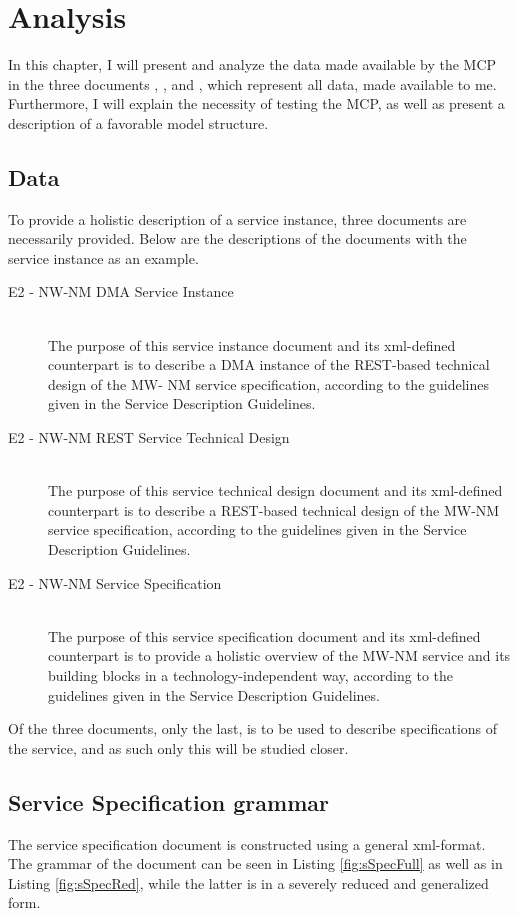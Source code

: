 \chapter{Analysis}

In this chapter, I will present and analyze the data made available by the MCP in the three documents , , and , which represent all data, made available to me. Furthermore, I will explain the necessity of testing the MCP, as well as present a description of a favorable model structure. 

\section{Data}

To provide a holistic description of a service instance, three documents are necessarily provided. Below are the descriptions of the documents with the service instance  as an example.
\begin{description}
	\item[E2 - NW-NM DMA Service Instance]\ \\
	The purpose of this service instance document and its xml-defined counterpart is to describe a DMA instance of the REST-based technical design of the MW- NM service specification, according to the guidelines given in the Service Description Guidelines.
	\item[E2 - NW-NM REST Service Technical Design]\ \\
	The purpose of this service technical design document and its xml-defined counterpart is to describe a REST-based technical design of the MW-NM service specification, according to the guidelines given in the Service Description Guidelines.
	\item[E2 - NW-NM Service Specification]\ \\
	The purpose of this service specification document and its xml-defined counterpart is to provide a holistic overview of the MW-NM service and its building blocks in a technology-independent way, according to the guidelines given in the Service Description Guidelines.
\end{description}
Of the three documents, only the last,  is to be used to describe specifications of the service, and as such only this will be studied closer.
\section{Service Specification grammar}
The service specification document is constructed using a general xml-format. The grammar of the document can be seen in Listing \ref{fig:sSpecFull} as well as in Listing \ref{fig:sSpecRed}, while the latter is in a severely reduced and generalized form.

